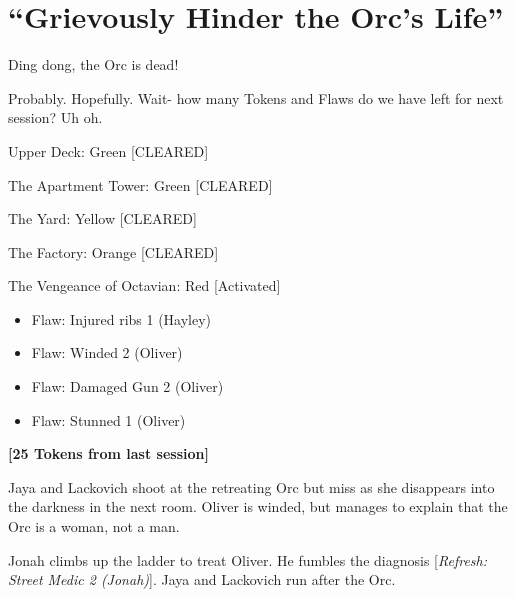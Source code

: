 \setcounter{chapter}{ 22 }
\chapter{\textbf{``Grievously Hinder the Orc's Life''} }







Ding dong, the Orc is dead!



Probably.  Hopefully.  Wait- how many Tokens and Flaws do we have left for next session?  Uh oh.








{\parskip=0pt
Upper Deck: Green {[}CLEARED{]}

The Apartment Tower: Green {[}CLEARED{]}

The Yard: Yellow {[}CLEARED{]}

The Factory: Orange {[}CLEARED{]}

The Vengeance of Octavian: Red {[}Activated{]}
}


\begin{itemize}[noitemsep,topsep=0pt]
\item  {\color[RGB]{255,0,0}Flaw: Injured ribs 1 (Hayley)} 
\item  {\color[RGB]{255,0,0}Flaw: Winded 2 (Oliver)} 
\item  {\color[RGB]{255,0,0}Flaw: Damaged Gun 2 (Oliver)}  
\item  {\color[RGB]{255,0,0}Flaw: Stunned 1 (Oliver)} 
\end{itemize}


\textbf{{[}25 Tokens from last session{]}}



Jaya and Lackovich shoot at the retreating Orc but miss as she disappears into the darkness in the next room.  Oliver is winded, but manages to explain that the Orc is a woman, not a man.



Jonah climbs up the ladder to treat Oliver.  He fumbles the diagnosis {[}\textit{Refresh: Street Medic 2 (Jonah)}{]}.  Jaya and Lackovich run after the Orc.



